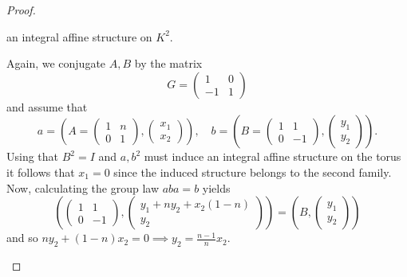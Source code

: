 \begin{proof}
\begin{case}[$A=A_3$, $B=B_2$]
        an integral affine structure on $K^2$.
    \end{case}
    \begin{case}[$A=A_4$, $B=B_2$]
        Again, we conjugate $A,B$ by the matrix
        $$
            G = \begin{pmatrix}
                1  & 0 \\
                -1 & 1
            \end{pmatrix}
        $$
        and assume that
        $$
            a = \left(A = \begin{pmatrix}
                    1 & n \\
                    0 & 1
                \end{pmatrix} , \begin{pmatrix}
                    x_1 \\ x_2
                \end{pmatrix}\right), \quad b =\left(B = \begin{pmatrix}
                    1 & 1  \\
                    0 & -1
                \end{pmatrix} , \begin{pmatrix}
                    y_1 \\ y_2
                \end{pmatrix}\right).
        $$
        Using that $B^2 = I$ and $a,b^2$ must induce an integral affine structure on the torus it follows that $x_1 = 0$ since the induced structure belongs to the second family.
        Now, calculating the group law $aba = b$ yields
        $$
            \left(\begin{pmatrix}
                    1 & 1  \\
                    0 & -1
                \end{pmatrix} , \begin{pmatrix}
                    y_1 + ny_2 + x_2(1-n) \\ y_2
                \end{pmatrix}\right) = \left(B , \begin{pmatrix}
                    y_1 \\ y_2
                \end{pmatrix}\right)
        $$
        and so $ny_2 + (1-n)x_2 = 0 \implies y_2 = \frac{n-1}{n}x_2$.


\end{case}
\end{proof}
